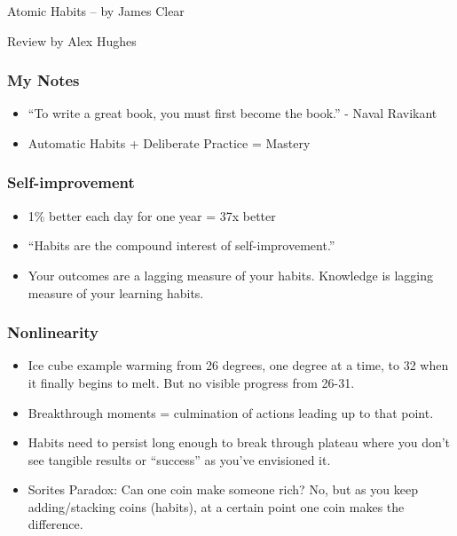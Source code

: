 \begin{frame}[fragile]\frametitle{}
\begin{center}
{\Large Atomic Habits – by James Clear}

{\small Review by Alex Hughes}


\end{center}
\end{frame}


\begin{frame}[fragile]\frametitle{My Notes}

\begin{itemize}
\item ``To write a great book, you must first become the book.'' - Naval Ravikant 
\item Automatic Habits + Deliberate Practice = Mastery 
\end{itemize}
\end{frame}

\begin{frame}[fragile]\frametitle{Self-improvement}

\begin{itemize}
\item 1\% better each day for one year = 37x better 

\item ``Habits are the compound interest of self-improvement.'' 
\item Your outcomes are a lagging measure of your habits. Knowledge is lagging measure of your learning habits.  
\end{itemize}
\end{frame}

\begin{frame}[fragile]\frametitle{Nonlinearity}

\begin{itemize}
\item Ice cube example warming from 26 degrees, one degree at a time, to 32 when it finally begins to melt. But no visible progress from 26-31. 
\item Breakthrough moments = culmination of actions leading up to that point.  
\item Habits need to persist long enough to break through plateau where you don’t see tangible results or ``success” as you’ve envisioned it.  
\item Sorites Paradox: Can one coin make someone rich? No, but as you keep adding/stacking coins (habits), at a certain point one coin makes the difference. 
\end{itemize}
\end{frame}

